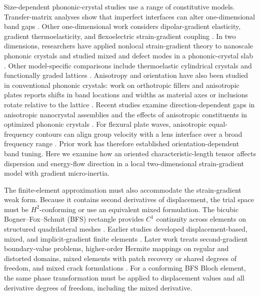 Size-dependent phononic-crystal studies use a range of constitutive models. Transfer-matrix analyses show that imperfect interfaces can alter one-dimensional band gaps \cite{zhengwei2009}. Other one-dimensional work considers dipolar-gradient elasticity, gradient thermoelasticity, and flexoelectric strain-gradient coupling \cite{liweizhou2016,li2023anchorA,li2024anchorB,HosseiniSladekSladekZhang2024}. In two dimensions, researchers have applied nonlocal strain-gradient theory to nanoscale phononic crystals and studied mixed and defect modes in a phononic-crystal slab \cite{JinHuHu2022,JinHuHu2023}. Other model-specific comparisons include thermoelastic cylindrical crystals and functionally graded lattices \cite{hosseinizhang2021,mishra2026anchorC}. Anisotropy and orientation have also been studied in conventional phononic crystals: work on orthotropic fillers and anisotropic plates reports shifts in band locations and widths as material axes or inclusions rotate relative to the lattice \cite{zhanwei2010,YaoWuHouXin2011}. Recent studies examine direction-dependent gaps in anisotropic nanocrystal assemblies and the effects of anisotropic constituents in optimized phononic crystals \cite{Kim2023,Liu2024anisotropic}. For flexural plate waves, anisotropic equal-frequency contours can align group velocity with a lens interface over a broad frequency range \cite{Danawe2023}. Prior work has therefore established orientation-dependent band tuning. Here we examine how an oriented characteristic-length tensor affects dispersion and energy-flow direction in a local two-dimensional strain-gradient model with gradient micro-inertia.

The finite-element approximation must also accommodate the strain-gradient weak form. Because it contains second derivatives of displacement, the trial space must be $H^2$-conforming or use an equivalent mixed formulation. The bicubic Bogner--Fox--Schmit (BFS) rectangle provides $C^1$ continuity across elements on structured quadrilateral meshes \cite{bfs1965}. Earlier studies developed displacement-based, mixed, and implicit-gradient finite elements \cite{ShuKingFleck1999,AmanatidouAravas2002,ZervosPapanicolopulosVardoulakis2009,Beheshti2017}. Later work treats second-gradient boundary-value problems, higher-order Hermite mappings on regular and distorted domains, mixed elements with patch recovery or shared degrees of freedom, and mixed crack formulations \cite{AndreausDellIsolaGiorgioPlacidiLekszyckiRizzi2016,BacciocchiFantuzzi2023,BacciocchiFantuzzi2025,ChoiLeeSim2023,Papanicolopulos2024,ChirkovNazarenkoAltenbach2024}. For a conforming BFS Bloch element, the same phase transformation must be applied to displacement values and all derivative degrees of freedom, including the mixed derivative.

